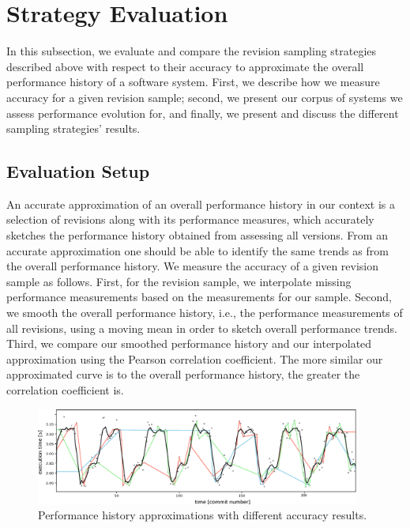 \section{Strategy Evaluation}\label{sec:revsampling_eval}
In this subsection, we evaluate and compare the revision sampling strategies
described above with respect to their accuracy to approximate the overall
performance history of a software system. First, we  describe how we measure
accuracy for a given revision sample; second, we present our corpus of systems
we assess performance evolution for, and finally, we present and discuss the
different sampling strategies’ results.

\subsection{Evaluation Setup}
An accurate approximation of an overall performance
history in our context is a selection of revisions along with its performance measures, which accurately
sketches the performance history obtained from assessing all versions. From an
accurate approximation one should be able to identify the same trends as from
the overall performance history. We measure the accuracy of a given revision
sample as follows. First, for the revision sample, we interpolate missing
performance measurements based on the measurements for our sample. Second, we
smooth the overall performance history, i.e., the performance measurements of
all revisions, using a moving mean in order to sketch overall performance
trends. Third, we compare our smoothed performance history and our interpolated
approximation using the Pearson correlation coefficient. The more similar
our approximated curve is to the overall performance history, the greater the
correlation coefficient is. 

\begin{figure}[h!]
	\centering
	\includegraphics[width=0.95\textwidth]{images/approximations.eps}
	\caption{Performance history approximations with different accuracy results.}
	\label{fig:approximation_accuracy}
\end{figure}

